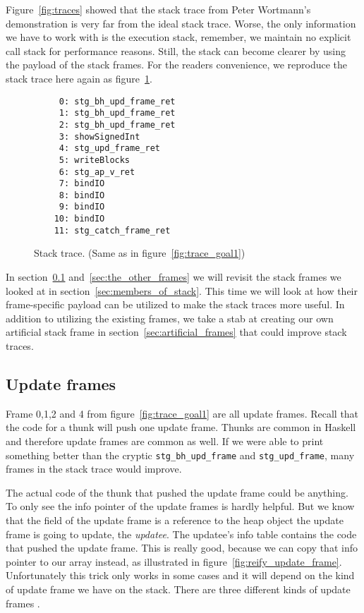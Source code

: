 Figure~\ref{fig:traces} showed that the stack trace from Peter Wortmann's
demonstration is very far from the ideal stack trace.  Worse, the only
information we have to work with is the execution stack, remember, we maintain no
explicit call stack for performance reasons. Still, the stack can become
clearer by using the payload of the stack frames. For the readers convenience,
we reproduce the stack trace here again as figure~\ref{fig:traces_2}.

\begin{figure}
\begin{mdframed}
  \begin{verbatim}
     0: stg_bh_upd_frame_ret
     1: stg_bh_upd_frame_ret
     2: stg_bh_upd_frame_ret
     3: showSignedInt
     4: stg_upd_frame_ret
     5: writeBlocks
     6: stg_ap_v_ret
     7: bindIO
     8: bindIO
     9: bindIO
    10: bindIO
    11: stg_catch_frame_ret
  \end{verbatim}
        \caption{Stack trace. (Same as in figure~\ref{fig:trace_goal1})}\label{fig:traces_2}
\end{mdframed}
\end{figure}

In section~\ref{sec:update_frames} and~\ref{sec:the_other_frames}
we will revisit the stack frames we looked at in
section~\ref{sec:members_of_stack}. This time we will look at how
their frame-specific payload can be utilized to make the stack
traces more useful. In addition to utilizing the existing frames, we
take a stab at creating our own artificial stack frame in
section~\ref{sec:artificial_frames} that could improve stack traces.

\subsection{Update frames} \label{sec:update_frames}

Frame 0,1,2 and 4 from figure~\ref{fig:trace_goal1} are all update
frames. Recall that the code for a thunk will push one update
frame. Thunks are common in Haskell and therefore update frames are common
as well. If we were able to print something better
than the cryptic \texttt{stg\_bh\_upd\_frame} and \texttt{stg\_upd\_frame},
many frames in the stack trace would improve.

The actual code of the thunk that pushed the update frame
could be anything. To only see the info pointer of the update frames is hardly helpful.
But we know that the field of the update frame is a reference to the
heap object the update frame is going to update, the \emph{updatee}. The updatee's
info table contains the code that pushed the update frame.
This is really good, because we can copy that info pointer to our array instead,
as illustrated in figure~\ref{fig:reify_update_frame}.
Unfortunately this trick only works in some cases and it will depend on the kind of
update frame we have on the stack. There are three different kinds of
update frames \cite{github_updates_cmm}.

